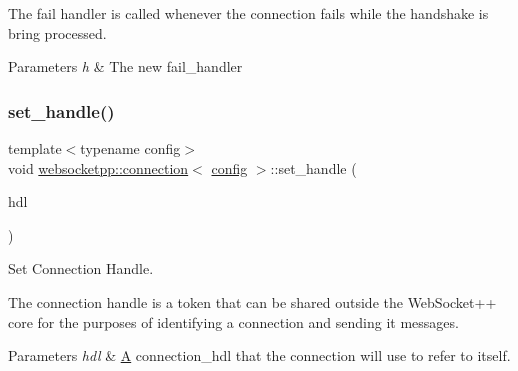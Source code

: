 The fail handler is called whenever the connection fails while the handshake is bring processed.


\begin{DoxyParams}{Parameters}
{\em h} & The new fail\+\_\+handler \\
\hline
\end{DoxyParams}
\mbox{\label{classwebsocketpp_1_1connection_af07f4fac45e1b64de7e0d12ece0d23a8}} 
\subsubsection{\texorpdfstring{set\+\_\+handle()}{set\_handle()}}
{\footnotesize\ttfamily template$<$typename config$>$ \\
void \mbox{\hyperlink{classwebsocketpp_1_1connection}{websocketpp\+::connection}}$<$ \mbox{\hyperlink{classconfig}{config}} $>$\+::set\+\_\+handle (\begin{DoxyParamCaption}\item[{\mbox{\hyperlink{namespacewebsocketpp_a6b3d26a10ee7229b84b776786332631d}{connection\+\_\+hdl}}}]{hdl }\end{DoxyParamCaption})\hspace{0.3cm}{\ttfamily [inline]}}



Set Connection Handle. 

The connection handle is a token that can be shared outside the Web\+Socket++ core for the purposes of identifying a connection and sending it messages.


\begin{DoxyParams}{Parameters}
{\em hdl} & \mbox{\hyperlink{struct_a}{A}} connection\+\_\+hdl that the connection will use to refer to itself. \\
\hline
\end{DoxyParams}
\mbox{\label{classwebsocketpp_1_1connection_a78c680623660b0442394af6b45c46c23}} 
